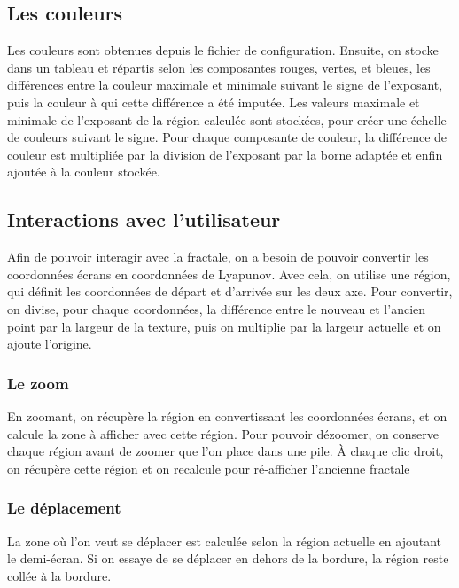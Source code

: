 \documentclass{article}
\begin{document}
	\subsection{Les couleurs}

	Les couleurs sont obtenues depuis le fichier de configuration.
	Ensuite, on stocke dans un tableau et répartis selon les composantes rouges, vertes, et bleues, les différences entre la couleur maximale et minimale suivant le signe de l'exposant, puis la couleur à qui cette différence a été imputée.
	Les valeurs maximale et minimale de l'exposant de la région calculée sont stockées, pour créer une échelle de couleurs suivant le signe.
	Pour chaque composante de couleur, la différence de couleur est multipliée par la division de l'exposant par la borne adaptée et enfin ajoutée à la couleur stockée.

	\subsection{Interactions avec l'utilisateur}

	Afin de pouvoir interagir avec la fractale, on a besoin de pouvoir convertir les coordonnées écrans en coordonnées de Lyapunov.
	Avec cela, on utilise une région, qui définit les coordonnées de départ et d'arrivée sur les deux axe.
	Pour convertir, on divise, pour chaque coordonnées, la différence entre le nouveau et l'ancien point par la largeur de la texture, puis on multiplie par la largeur actuelle et on ajoute l'origine.

	\subsubsection{Le zoom}

	En zoomant, on récupère la région en convertissant les coordonnées écrans, et on calcule la zone à afficher avec cette région.
	Pour pouvoir dézoomer, on conserve chaque région avant de zoomer que l'on place dans une pile.
	À chaque clic droit, on récupère cette région et on recalcule pour ré-afficher l'ancienne fractale

	\subsubsection{Le déplacement}

	La zone où l'on veut se déplacer est calculée selon la région actuelle en ajoutant le demi-écran.
	Si on essaye de se déplacer en dehors de la bordure, la région reste collée à la bordure.
\end{document}
